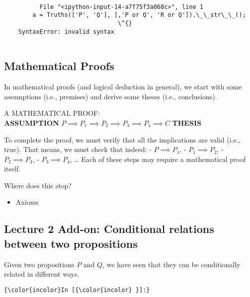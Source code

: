 \documentclass[11pt]{article}
\providecommand{\tightlist}{%
      \setlength{\itemsep}{0pt}\setlength{\parskip}{0pt}}
\begin{document}
    \begin{Verbatim}[commandchars=\\\{\}]

          File "<ipython-input-14-a7f75f3a068c>", line 1
        a = Truths(['P', 'Q'], [,'P or Q', 'R or Q']).\_\_str\_\_();
                                \^{}
    SyntaxError: invalid syntax


    \end{Verbatim}

    \subsection{Mathematical Proofs}\label{mathematical-proofs}

    In mathematical proofs (and logical deduction in general), we start with
some assumptions (i.e., premises) and derive some theses (i.e.,
conclusions).

A MATHEMATICAL PROOF:\\
\textbf{ASSUMPTION}
\(P \implies P_1 \implies P_2 \implies P_3 \implies P_4 \implies C\)
\textbf{THESIS}

To complete the proof, we must verify that all the implications are
valid (i.e., true). That means, we must check that indeed: -
\(P \implies P_1\), - \(P_1 \implies P_2\), - \(P_2 \implies P_3\), -
\(P_3 \implies P_4\), \ldots{} Each of these steps may require a
mathematical proof itself.

    Where does this stop?

\begin{itemize}
\tightlist
\item
  Axioms
\end{itemize}

    \subsection{Lecture 2 Add-on: Conditional relations between two
propositions}\label{lecture-2-add-on-conditional-relations-between-two-propositions}

Given two propositions \(P\) and \(Q\), we have seen that they can be
conditionally related in different ways.

    \begin{Verbatim}[commandchars=\\\{\}]
{\color{incolor}In [{\color{incolor} }]:} 
\end{Verbatim}


    
    
    
    
\end{document}

